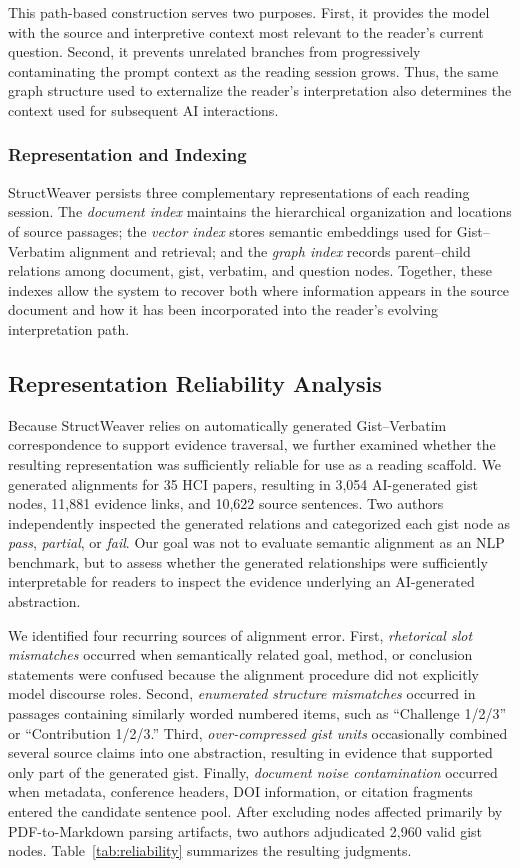 \documentclass[manuscript,review,anonymous]{acmart}
\begin{document}
This path-based construction serves two purposes. First, it provides the model with the source and interpretive context most relevant to the reader's current question. Second, it prevents unrelated branches from progressively contaminating the prompt context as the reading session grows. Thus, the same graph structure used to externalize the reader's interpretation also determines the context used for subsequent AI interactions.

\subsubsection{Representation and Indexing}
StructWeaver persists three complementary representations of each reading session. The \textit{document index} maintains the hierarchical organization and locations of source passages; the \textit{vector index} stores semantic embeddings used for Gist--Verbatim alignment and retrieval; and the \textit{graph index} records parent--child relations among document, gist, verbatim, and question nodes. Together, these indexes allow the system to recover both where information appears in the source document and how it has been incorporated into the reader's evolving interpretation path.

\subsection{Representation Reliability Analysis}
\label{sec:reliability}

Because StructWeaver relies on automatically generated Gist--Verbatim correspondence to support evidence traversal, we further examined whether the resulting representation was sufficiently reliable for use as a reading scaffold. We generated alignments for 35 HCI papers, resulting in 3,054 AI-generated gist nodes, 11,881 evidence links, and 10,622 source sentences. Two authors independently inspected the generated relations and categorized each gist node as \textit{pass}, \textit{partial}, or \textit{fail}. Our goal was not to evaluate semantic alignment as an NLP benchmark, but to assess whether the generated relationships were sufficiently interpretable for readers to inspect the evidence underlying an AI-generated abstraction.

We identified four recurring sources of alignment error. First, \textit{rhetorical slot mismatches} occurred when semantically related goal, method, or conclusion statements were confused because the alignment procedure did not explicitly model discourse roles. Second, \textit{enumerated structure mismatches} occurred in passages containing similarly worded numbered items, such as ``Challenge 1/2/3'' or ``Contribution 1/2/3.'' Third, \textit{over-compressed gist units} occasionally combined several source claims into one abstraction, resulting in evidence that supported only part of the generated gist. Finally, \textit{document noise contamination} occurred when metadata, conference headers, DOI information, or citation fragments entered the candidate sentence pool. After excluding nodes affected primarily by PDF-to-Markdown parsing artifacts, two authors adjudicated 2,960 valid gist nodes. Table~\ref{tab:reliability} summarizes the resulting judgments.
\end{document}
